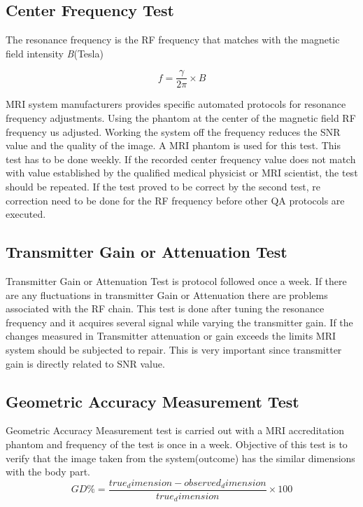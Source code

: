 \documentclass[12pt]{article}
\begin{document}
\subsection{Center Frequency Test}
The resonance frequency is the RF frequency that matches with the magnetic field intensity \textit B(Tesla)

\begin{equation*}
    f = \frac{\gamma}{2\pi}\times B
\end{equation*}

MRI system manufacturers provides specific automated protocols for resonance frequency adjustments. Using the phantom at the center of the magnetic field RF frequency us adjusted. Working the system off the frequency reduces the SNR value and the quality of the image. A MRI phantom is used for this test. This test has to be done weekly. If the recorded center frequency value does not match with value established by the qualified medical physicist or MRI scientist, the test should be repeated. If the test proved to be correct by the second test, re correction need to be done for the RF frequency before other QA protocols are executed. 

\subsection{Transmitter Gain or Attenuation Test}
Transmitter Gain or Attenuation Test is protocol followed once a week. If there are any fluctuations in transmitter Gain or Attenuation there are problems associated with the RF chain. This test is done after tuning the resonance frequency and it acquires several signal while varying the transmitter gain. If the changes measured in Transmitter attenuation or gain exceeds the limits MRI system should be subjected to repair. This is very important since transmitter gain is directly related to SNR value. 

\subsection{Geometric Accuracy Measurement Test}
Geometric Accuracy Measurement test is carried out with a MRI accreditation phantom and frequency of the test is once in a week. Objective of this test is to verify that the image taken from the system(outcome) has the similar dimensions with the body part. 
\begin{equation*}
    \textit{GD\%} = \frac{true_dimension-observed_dimension}{true_dimension}\times 100
\end{equation*}
\end{document}
